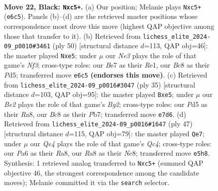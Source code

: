 \documentclass[11pt]{article}
\begin{document}
\clearpage

\begin{figure}[p]\centering
\begin{subfigure}{0.46\textwidth}\centering
\resizebox{\linewidth}{!}{%
\newchessgame
\chessboard[
  setfen={r1b2kr1/1p2bp1p/p3n1p1/2Npq3/8/3KBPN1/PP4PP/1R1Q1B1R b - - 0 22},
  showmover=false,
  pgfstyle=straightmove, color=movearrow, markmove={e6-c5}
]}
\caption{}
\end{subfigure}\hfill
\begin{subfigure}{0.46\textwidth}\centering
\resizebox{\linewidth}{!}{%
\newchessgame
\chessboard[
  setfen={r2k3r/ppqbbQ1p/5pnB/2PPn3/8/1B3N2/P4PPP/R3R1K1 w - - 1 26},
  showmover=false,
  pgfstyle=straightmove, color=movearrow, markmove={f3-e5}
]}
\caption{}
\end{subfigure}
\\[4pt]
\begin{subfigure}{0.46\textwidth}\centering
\resizebox{\linewidth}{!}{%
\newchessgame
\chessboard[
  setfen={r3r1k1/1p1b2bp/pqnPp1p1/2p1N1B1/P7/2N4P/1P1QB1P1/R3K2R b KQ - 0 18},
  showmover=false,
  pgfstyle=straightmove, color=movearrow, markmove={g7-e5}
]}
\caption{}
\end{subfigure}\hfill
\begin{subfigure}{0.46\textwidth}\centering
\resizebox{\linewidth}{!}{%
\newchessgame
\chessboard[
  setfen={r1n3k1/6pb/2p1rn1p/p1qp4/P5N1/1P6/4B1PP/R1BQ1R1K b - - 1 24},
  showmover=false,
  pgfstyle=straightmove, color=movearrow, markmove={c5-e7}
]}
\caption{}
\end{subfigure}
\caption{\textbf{Move 22, Black: \texttt{Nxc5+}.} (a) Our position; Melanie plays \texttt{Nxc5+} (\texttt{e6c5}). Panels (b)--(d) are the retrieved master positions whose correspondence most drove this move (highest QAP objective among those that transfer to it). (b) Retrieved from \texttt{lichess\_elite\_2024-09\_p0010\#3461} (ply 50) [structural distance $d$=113, QAP obj=46]: the master played \texttt{Nxe5}; under $\mu$ our \emph{Ne3} plays the role of that game's \emph{Nf3}; cross-type roles: our \emph{B}e7 as their \emph{R}e1, our \emph{B}c8 as their \emph{P}d5; transferred move \texttt{e6c5} \textbf{(endorses this move)}. (c) Retrieved from \texttt{lichess\_elite\_2024-09\_p0016\#3047} (ply 35) [structural distance $d$=103, QAP obj=95]: the master played \texttt{Bxe5}; under $\mu$ our \emph{Be2} plays the role of that game's \emph{Bg2}; cross-type roles: our \emph{P}d5 as their \emph{R}a8, our \emph{B}c8 as their \emph{P}b7; transferred move \texttt{e7d6}. (d) Retrieved from \texttt{lichess\_elite\_2024-09\_p0016\#1647} (ply 47) [structural distance $d$=115, QAP obj=79]: the master played \texttt{Qe7}; under $\mu$ our \emph{Qe4} plays the role of that game's \emph{Qc4}; cross-type roles: our \emph{P}a6 as their \emph{R}a8, our \emph{R}a8 as their \emph{N}c8; transferred move \texttt{e5h8}. Synthesis: 1 retrieved analog transferred to \texttt{Nxc5+} (summed QAP objective 46, the strongest correspondence among the candidate moves); Melanie committed it via the \texttt{search} selector.}
\label{fig:thought-m43}
\end{figure}
\end{document}
